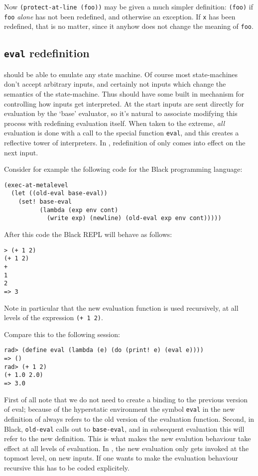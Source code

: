 Now \texttt{(protect-at-line (foo))} may be given a much simpler definition:
\texttt{(foo)} if \texttt{foo} \emph{alone} has not been redefined, and otherwise
an exception. If \texttt{x} has been redefined, that is no matter, since it
anyhow does not change the meaning of \texttt{foo}.


\subsection{\texttt{eval} redefinition}

\rad should be able to emulate any state machine. Of course most state-machines
don't accept arbitrary inputs, and certainly not inputs which change the
semantics of the state-machine. Thus \rad should have some built in mechanism
for controlling how inputs get interpreted. At the start inputs are sent
directly for evaluation by the `base' evaluator, so it's natural to associate
modifying this process with redefining evaluation itself. When taken to the
extreme, \emph{all} evaluation is done with a call to the special function
\texttt{eval}, and this creates a reflective tower of interpreters. In \rad,
redefinition of  only comes into effect on the next input.

Consider for example the following code for the Black programming language:
\begin{verbatim}
(exec-at-metalevel
  (let ((old-eval base-eval))
    (set! base-eval
          (lambda (exp env cont)
            (write exp) (newline) (old-eval exp env cont)))))
\end{verbatim}
After this code the Black REPL will behave as follows:
\begin{verbatim}
> (+ 1 2)
(+ 1 2)
+
1
2
=> 3
\end{verbatim}
Note in particular that the new evaluation function is used recursively, at all
levels of the expression \texttt{(+ 1 2)}.

Compare this to the following \rad session:
\begin{verbatim}
rad> (define eval (lambda (e) (do (print! e) (eval e))))
=> ()
rad> (+ 1 2)
(+ 1.0 2.0)
=> 3.0
\end{verbatim}
First of all note that we do not need to create a binding to the previous
version of eval; because of the hyperstatic environment the symbol \texttt{eval}
in the new definition of always refers to the old version of the evaluation
function. Second, in Black, \texttt{old-eval} calls out to \texttt{base-eval},
and in subsequent evaluation this will refer to the new definition. This is what
makes the new evalution behaviour take effect at all levels of evaluation. In
\rad, the new evaluation only gets invoked at the topmost level, on new inputs.
If one wants to make the evaluation behaviour recursive this has to be coded
explicitely.

